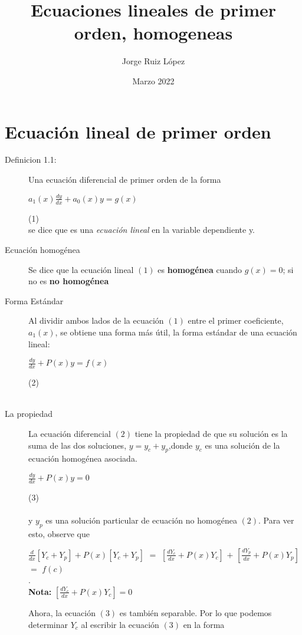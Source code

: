 \documentclass{article}
\title{Ecuaciones lineales de primer orden, homogeneas}
\author{Jorge Ruiz López}
\affil{Facultad de Ingeniería UNAM}
\date{Marzo 2022}
\begin{document}
\maketitle

\section{Ecuación lineal de primer orden}
\begin{description}
\item[Definicion 1.1:]Una ecuación diferencial de primer orden de la forma
\begin{center}
    $a_1(x) \frac{dy}{dx} + a_0(x)y =  g(x)$
\end{center}\tab (1)\\\break
se dice que es una \cite{zill}\textit{ecuación lineal} en la variable dependiente y.
\item[Ecuación homogénea]Se dice que la ecuación lineal $(1)$ es \textbf{homogénea} cuando $g(x) = 0$; si no es \textbf{no homogénea}
\item[Forma Estándar]Al dividir ambos lados de la ecuación $(1)$ entre el primer coeficiente, $a_1(x)$, se obtiene una forma más útil, la forma estándar de una ecuación lineal:
\begin{center}
    $\frac{dy}{dx} + P(x)y = f(x)$
\end{center}\tab (2)\\\\
\item[La propiedad]La ecuación diferencial $(2)$ tiene la propiedad de que su solución es la suma de las dos soluciones, $y=y_c +y_p$,donde $y_c$ es una solución de la ecuación homogénea asociada.
\begin{center}
    $\frac{dy}{dx} + P(x)y = 0$
\end{center}\tab (3)\\\\
y $y_p$ es una solución particular de ecuación no homogénea $(2)$. Para ver esto, observe que
\begin{center}
    $\frac{d}{dx}[Y_c +Y_p] + P(x)[Y_c +Y_p]$ $=$  $[\frac{dY_c}{dx}+ P(x)Y_c]$ $+$ $[\frac{dY_p}{dx}+ P(x)Y_p]$ $=$ $f(c)$\\.\\
    \textbf{Nota:} $[\frac{dY_c}{dx}+ P(x)Y_c] = 0$
\end{center}
Ahora, la ecuación $(3)$ es también separable. Por lo que podemos determinar $Y_c$ al escribir la ecuación $(3)$ en la forma
\begin{center}

\end{center}
\end{description}
\end{document}
